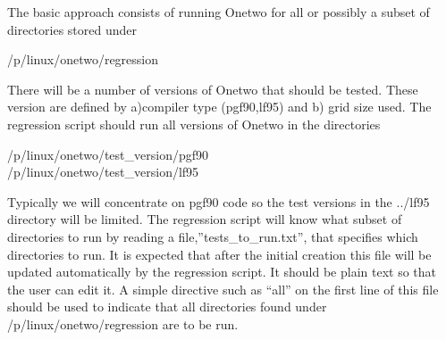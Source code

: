\documentclass[12pt]{article}
\begin{document}
The basic approach consists of running Onetwo for all or possibly
a subset of directories stored under \\
\begin{center} /p/linux/onetwo/regression  \end{center}
There will be a number of versions of Onetwo that should be tested.
These version are defined by a)compiler type (pgf90,lf95) and b) grid
size used. The regression script should run all versions of Onetwo
in the directories
\begin{center}  /p/linux/onetwo/test\_version/pgf90 \\
  /p/linux/onetwo/test\_version/lf95  \end{center}
Typically we will concentrate on pgf90 code so the test versions in
the ../lf95 directory will be limited.
The regression script will know what subset of directories to run
by reading a file,''tests\_to\_run.txt'', that specifies which directories to run. It is
expected that after the initial creation this file will be updated
automatically by the regression script. It should be plain text so
that the user can edit it. A simple directive such  as ``all'' on the
first line of this file should be used to indicate that all
directories found under /p/linux/onetwo/regression are to be run.
\end{document}
